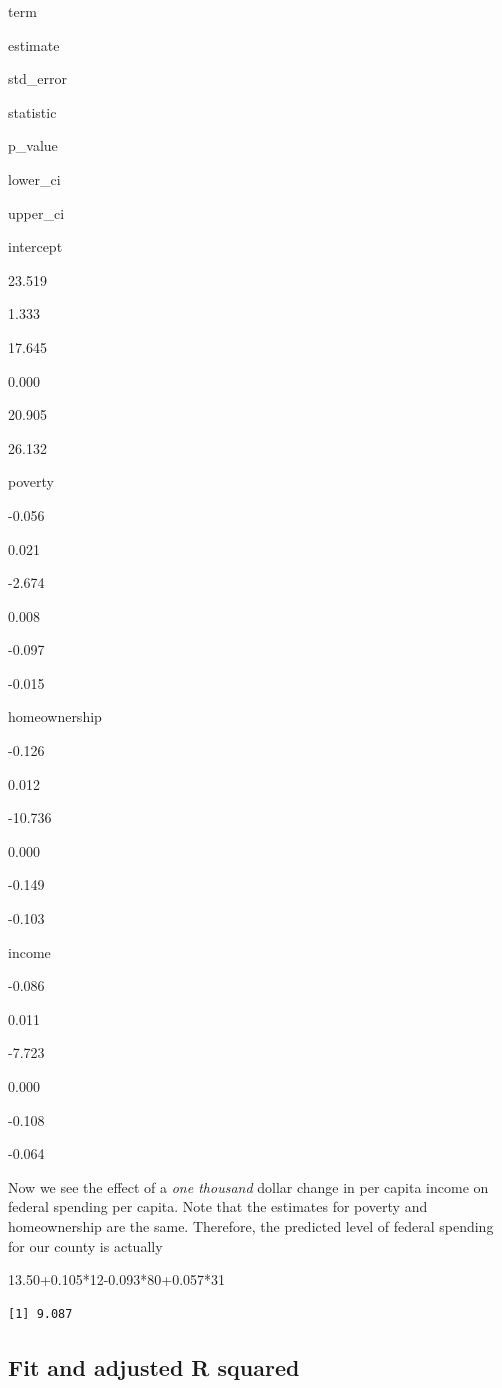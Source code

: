 \documentclass[
]{book}
\makeatletter
\newenvironment{Shaded}{\begin{snugshade}}{\end{snugshade}}
\newcommand{\DecValTok}[1]{\textcolor[rgb]{0.06,0.06,0.06}{#1}}
\newcommand{\FloatTok}[1]{\textcolor[rgb]{0.06,0.06,0.06}{#1}}
\newcommand{\SpecialCharTok}[1]{\textcolor[rgb]{0,0,0}{#1}}
\newenvironment{kframe}{%
\medskip{}
\setlength{\fboxsep}{.8em}
 \def\at@end@of@kframe{}%
 \ifinner\ifhmode%
  \def\at@end@of@kframe{\end{minipage}}%
  \begin{minipage}{\columnwidth}%
 \fi\fi%
 \def\FrameCommand##1{\hskip\@totalleftmargin \hskip-\fboxsep
 \colorbox{shadecolor}{##1}\hskip-\fboxsep
     \hskip-\linewidth \hskip-\@totalleftmargin \hskip\columnwidth}%
 \MakeFramed {\advance\hsize-\width
   \@totalleftmargin\z@ \linewidth\hsize
   \@setminipage}}%
 {\par\unskip\endMakeFramed%
 \at@end@of@kframe}
\renewenvironment{Shaded}{\begin{kframe}}{\end{kframe}}
\makeatother
\begin{document}
term

estimate

std\_error

statistic

p\_value

lower\_ci

upper\_ci

intercept

23.519

1.333

17.645

0.000

20.905

26.132

poverty

-0.056

0.021

-2.674

0.008

-0.097

-0.015

homeownership

-0.126

0.012

-10.736

0.000

-0.149

-0.103

income

-0.086

0.011

-7.723

0.000

-0.108

-0.064

Now we see the effect of a \emph{one thousand} dollar change in per capita income on federal spending per capita. Note that the estimates for poverty and homeownership are the same. Therefore, the predicted level of federal spending for our county is actually

\begin{Shaded}
\begin{Highlighting}[]
\FloatTok{13.50+0.105}\SpecialCharTok{*}\DecValTok{12}\FloatTok{{-}0.093}\SpecialCharTok{*}\DecValTok{80}\FloatTok{+0.057}\SpecialCharTok{*}\DecValTok{31}
\end{Highlighting}
\end{Shaded}

\begin{verbatim}
[1] 9.087
\end{verbatim}

\hypertarget{fit-and-adjusted-r-squared}{%
\subsection{Fit and adjusted R squared}\label{fit-and-adjusted-r-squared}}
\end{document}
